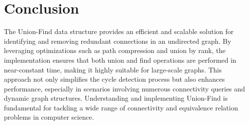 \section*{Conclusion}

The Union-Find data structure provides an efficient and scalable solution for identifying and removing redundant connections in an undirected graph. By leveraging optimizations such as path compression and union by rank, the implementation ensures that both union and find operations are performed in near-constant time, making it highly suitable for large-scale graphs. This approach not only simplifies the cycle detection process but also enhances performance, especially in scenarios involving numerous connectivity queries and dynamic graph structures. Understanding and implementing Union-Find is fundamental for tackling a wide range of connectivity and equivalence relation problems in computer science.

\printindex

% 
% 
% 
% 